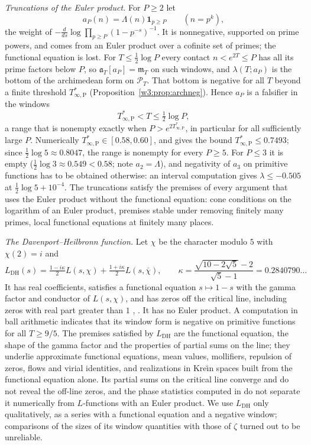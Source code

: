 \documentclass[11pt]{amsart}
\theoremstyle{definition}
\theoremstyle{remark}
\numberwithin{equation}{section}
\newcommand{\PT}{\mathcal{P}_T}                        %
\newcommand{\mT}{\mathfrak{m}_T}                       %
\newcommand{\aT}{\mathfrak{a}_T}                       %
\newcommand{\Tarch}{T^{*}_{\infty,\mathrm P}}          %
\begin{document}
\emph{Truncations of the Euler product.} For $P\ge2$ let
\[
  a_P(n)=\Lambda(n)\mathbf 1_{p\ge P}\qquad(n=p^k),
\]
the weight of $-\frac{d}{ds}\log\prod_{p\ge P}(1-p^{-s})^{-1}$. It is nonnegative, supported on prime powers, and
comes from an Euler product over a cofinite set of primes; the functional equation is lost. For
$T\le\frac12\log P$ every contact $n<e^{2T}\le P$ has all its prime factors below $P$, so $\aT[a_P]=\mT$ on such
windows, and $\lambda(T;a_P)$ is the bottom of the archimedean form on $\PT$. That bottom is negative for all
$T$ beyond a finite threshold $\Tarch$ (Proposition~\ref{w3:prop:archneg}). Hence $a_P$ is a falsifier in the windows
\[
  \Tarch<T\le\tfrac12\log P ,
\]
a range that is nonempty exactly when $P>e^{2\Tarch}$, in particular for all sufficiently large $P$. Numerically
$\Tarch\in[0.58,0.60]$, and \cite[Proposition~7.1]{P46} gives the bound $\Tarch\le0.7493$; since
$\frac12\log5\approx0.8047$, the range is nonempty for every $P\ge5$. For $P\le3$ it is empty
($\frac12\log3\approx0.549<0.58$; note $a_2=\Lambda$), and negativity of $a_3$ on primitive functions has to be
obtained otherwise: an interval computation gives $\lambda\le-0.505$ at $\frac12\log5+10^{-4}$. The truncations
satisfy the premises of every argument that uses the Euler product without the functional equation: cone conditions
on the logarithm of an Euler product, premises stable under removing finitely many primes, local functional
equations at finitely many places.

\emph{The Davenport--Heilbronn function.} Let $\chi$ be the character modulo $5$ with $\chi(2)=i$ and
\[
  L_{\mathrm{DH}}(s)=\tfrac{1-i\kappa}{2}L(s,\chi)+\tfrac{1+i\kappa}{2}L(s,\bar\chi),\qquad
  \kappa=\frac{\sqrt{10-2\sqrt5}-2}{\sqrt5-1}=0.2840790\ldots
\]
It has real coefficients, satisfies a functional equation $s\mapsto1-s$ with the gamma factor and conductor of
$L(s,\chi)$, and has zeros off the critical line, including zeros with real part greater than $1$
\cite{DavenportHeilbronn1936}, \cite[\S10.25]{Titchmarsh1986}. It has no Euler product. A computation in ball
arithmetic indicates that its window form is negative on primitive functions for all $T\ge9/5$. The premises
satisfied by $L_{\mathrm{DH}}$ are the functional equation, the shape of the gamma factor and the properties of
partial sums on the line; they underlie approximate functional equations, mean values, mollifiers, repulsion of
zeros, flows and virial identities, and realizations in Kre\u{\i}n spaces built from the functional equation alone.
Its partial sums on the critical line converge and do not reveal the off-line zeros, and the phase statistics
computed in \cite{P04} do not separate it numerically from $L$-functions with an Euler product. We use
$L_{\mathrm{DH}}$ only qualitatively, as a series with a functional equation and a negative window; comparisons of
the sizes of its window quantities with those of $\zeta$ turned out to be unreliable.
\end{document}
